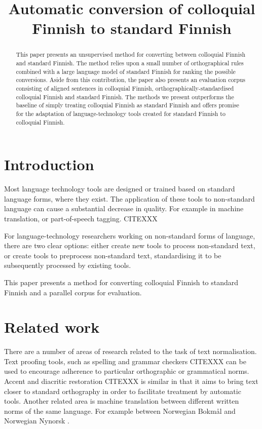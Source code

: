 \documentclass[11pt]{article}
\title{Automatic conversion of colloquial Finnish to standard Finnish}
\author{}
\date{}
\begin{document}
\maketitle
\begin{abstract}
  This paper presents an unsupervised method for converting between colloquial Finnish
  and standard Finnish. The method relies upon a small number of orthographical rules
  combined with a large language model of standard Finnish for ranking the possible 
  conversions. Aside from this contribution, the paper also presents an evaluation
  corpus consisting of aligned sentences in colloquial Finnish, orthographically-standardised
  colloquial Finnish and standard Finnish. The methods we present outperforms the baseline
  of simply treating colloquial Finnish as standard Finnish and offers promise for the adaptation
  of language-technology tools created for standard Finnish to colloquial Finnish.
\end{abstract}

\section{Introduction}

Most language technology tools are designed or trained based on standard language 
forms, where they exist. The application of these tools to non-standard
language can cause a substantial decrease in quality. For example in machine translation,
or part-of-speech tagging. CITEXXX

For language-technology researchers working on non-standard forms of language, there are 
two clear options: either create new tools to process non-standard text,
  or create tools to preprocess non-standard text, standardising it to be subsequently processed
 by existing tools.

This paper presents a method for converting colloquial Finnish to standard Finnish and 
a parallel corpus for evaluation.

\section{Related work}

There are a number of areas of research related to the task of text normalisation. Text
proofing tools, such as spelling and grammar checkers CITEXXX can be used to encourage adherence
to particular orthographic or grammatical norms. Accent and diacritic restoration CITEXXX is similar
in that it aims to bring text closer to standard orthography in order to facilitate treatment by 
automatic tools. Another related area is machine translation between different written norms of 
the same language. For example between Norwegian Bokmål and Norwegian Nynorsk \cite{unhammer2009}.
\end{document}
